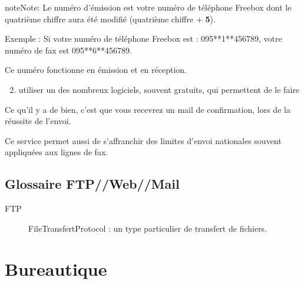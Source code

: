 \documentclass[a4paper,12pt,french]{sphinxmanual}
\begin{document}
\begin{notice}{note}{Note:}
Le numéro d'émission est votre numéro de téléphone Freebox dont le quatrième chiffre aura été modifié (quatrième chiffre + \textbf{5}).

Exemple : Si votre numéro de téléphone Freebox est : 095**1**456789, votre numéro de fax est 095**6**456789.

Ce numéro fonctionne en émission et en réception.
\end{notice}
\begin{enumerate}
\setcounter{enumi}{1}
\item {} 
utiliser un des nombreux logiciels, souvent gratuits, qui permettent de le faire

\end{enumerate}

Ce qu'il y a de bien, c'est que vous recevrez un mail de confirmation, lors de la réussite de l'envoi.

Ce service permet aussi de s'affranchir des limites d'envoi nationales souvent appliquées aux lignes de fax.
\begin{quote}
\label{ftpwebmail/glossaire_ftpwebmail:glossaire-ftpwebmail}\end{quote}


\section{Glossaire FTP//Web//Mail}
\label{ftpwebmail/glossaire_ftpwebmail::doc}\label{ftpwebmail/glossaire_ftpwebmail:glossaire-ftpwebmail}\label{ftpwebmail/glossaire_ftpwebmail:glossaire-ftp-web-mail}\begin{description}
\item[{FTP}] \leavevmode{}\label{ftpwebmail/glossaire_ftpwebmail:term-ftp}
FileTransfertProtocol : un type particulier de transfert de fichiers.

\end{description}


\chapter{Bureautique}
\label{burotic/index::doc}\label{burotic/index:bureautique}\begin{quote}
\label{burotic/glossaire_burotic:glossaire-burotic}\end{quote}
\end{document}
